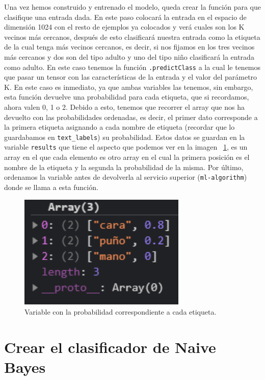 \documentclass[a4paper, 12pt]{book}
\begin{document}
Una vez hemos construido y entrenado el modelo, queda crear la función para que clasifique una entrada dada. En este paso colocará la entrada en el espacio de dimensión 1024 con el resto de ejemplos ya colocados y verá cuales son los K vecinos más cercanos, después de esto clasificará nuestra entrada como la etiqueta de la cual tenga más vecinos cercanos, es decir, si nos fijamos en los tres vecinos más cercanos y dos son del tipo adulto y uno del tipo niño clasificará la entrada como adulto. En este caso tenemos la función \texttt{.predictClass} a la cual le tenemos que pasar un tensor con las características de la entrada y el valor del parámetro K. En este caso es inmediato, ya que ambas variables las tenemos, sin embargo, esta función devuelve una probabilidad para cada etiqueta, que si recordamos, ahora valen 0, 1 o 2. Debido a esto, tenemos que recorrer el array que nos ha devuelto con las probabilidades ordenadas, es decir, el primer dato corresponde a la primera etiqueta asignando a cada nombre de etiqueta (recordar que lo guardabamos en \texttt{text\_labels}) su probabilidad. Estos datos se guardan en la variable \texttt{results} que tiene el aspecto que podemos ver en la imagen ~\ref{fig:resultsknn}, es un array en el que cada elemento es otro array en el cual la primera posición es el nombre de la etiqueta y la segunda la probabilidad de la misma. Por último, ordenamos la variable antes de devolverla al servicio superior (\texttt{ml-algorithm}) donde se llama a esta función.

\begin{figure}
	\centering
	\includegraphics[width=8cm, keepaspectratio]{img/resultsknn}
	\caption{Variable con la probabilidad correspondiente a cada etiqueta.}				
	\label{fig:resultsknn}
\end{figure}

\section{Crear el clasificador de Naive Bayes} 
\label{sec:naivebayes}
\end{document}
